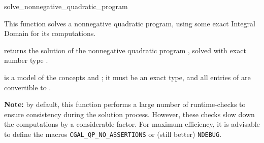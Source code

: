 \begin{ccRefFunction}{solve_nonnegative_quadratic_program}


This function solves a nonnegative quadratic program, using some exact
Integral Domain  for its computations.   

{returns the solution of the nonnegative quadratic program , solved
with exact number type .}

 is a model of the concepts  and
; it must
be an exact type, and all entries of  are convertible to 
.

{\bf Note:} by default, this function performs a large number of 
runtime-checks to ensure consistency during the solution process.
However, these checks slow down the computations by a considerable
factor. For maximum efficiency, it is advisable to define the macros
\texttt{CGAL\_QP\_NO\_ASSERTIONS} or (still better) 
\texttt{NDEBUG}.
\end{ccRefFunction}
